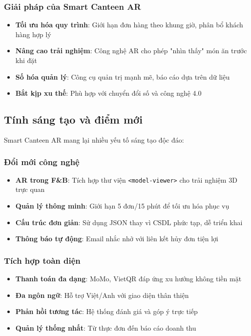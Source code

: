 \documentclass[12pt,a4paper]{article}
\begin{document}
\subsubsection{Giải pháp của Smart Canteen AR}
\begin{itemize}[leftmargin=1cm]
    \item \textbf{Tối ưu hóa quy trình}: Giới hạn đơn hàng theo khung giờ, phân bổ khách hàng hợp lý
    \item \textbf{Nâng cao trải nghiệm}: Công nghệ AR cho phép "nhìn thấy" món ăn trước khi đặt
    \item \textbf{Số hóa quản lý}: Công cụ quản trị mạnh mẽ, báo cáo dựa trên dữ liệu
    \item \textbf{Bắt kịp xu thế}: Phù hợp với chuyển đổi số và công nghệ 4.0
\end{itemize}

\subsection{Tính sáng tạo và điểm mới}
Smart Canteen AR mang lại nhiều yếu tố sáng tạo độc đáo:

\subsubsection{Đổi mới công nghệ}
\begin{itemize}[leftmargin=1cm]
    \item \textbf{AR trong F\&B}: Tích hợp thư viện \texttt{<model-viewer>} cho trải nghiệm 3D trực quan
    \item \textbf{Quản lý thông minh}: Giới hạn 5 đơn/15 phút để tối ưu hóa phục vụ
    \item \textbf{Cấu trúc đơn giản}: Sử dụng JSON thay vì CSDL phức tạp, dễ triển khai
    \item \textbf{Thông báo tự động}: Email nhắc nhở với liên kết hủy đơn tiện lợi
\end{itemize}

\subsubsection{Tích hợp toàn diện}
\begin{itemize}[leftmargin=1cm]
    \item \textbf{Thanh toán đa dạng}: MoMo, VietQR đáp ứng xu hướng không tiền mặt
    \item \textbf{Đa ngôn ngữ}: Hỗ trợ Việt/Anh với giao diện thân thiện
    \item \textbf{Phản hồi tương tác}: Hệ thống đánh giá và góp ý trực tiếp
    \item \textbf{Quản lý thống nhất}: Từ thực đơn đến báo cáo doanh thu
\end{itemize}
\end{document}
